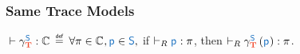 \subsubsection{Same Trace Models}

\begin{definition}{}
  \begin{center}
    $\rtp{\ccST}{\varClass}$
    $\isdef$
    $\forall \varProperty\in\varClass, \srcComponent\in\src{S},$ %
    if $\rsat{\srcComponent}{\varProperty}$,
    then $\rsat{\ccST\lrpars{\srcComponent}}{\varProperty}$.
  \end{center}
\end{definition}

